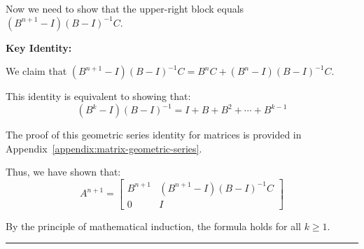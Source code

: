 Now we need to show that the upper-right block equals $(B^{n+1} - I)(B - I)^{-1}C$.

\textbf{Key Identity:}

We claim that $(B^{n+1} - I)(B - I)^{-1}C = B^n C + (B^n - I)(B - I)^{-1}C$.

This identity is equivalent to showing that:
$$(B^k - I)(B - I)^{-1} = I + B + B^2 + \cdots + B^{k-1}$$

The proof of this geometric series identity for matrices is provided in Appendix~\ref{appendix:matrix-geometric-series}.

Thus, we have shown that:
$$A^{n+1} = \begin{bmatrix} B^{n+1} & (B^{n+1} - I)(B - I)^{-1}C \\ 0 & I \end{bmatrix}$$

By the principle of mathematical induction, the formula holds for all $k \geq 1$.

\vspace{2em}
\noindent\rule{\textwidth}{0.4pt}
